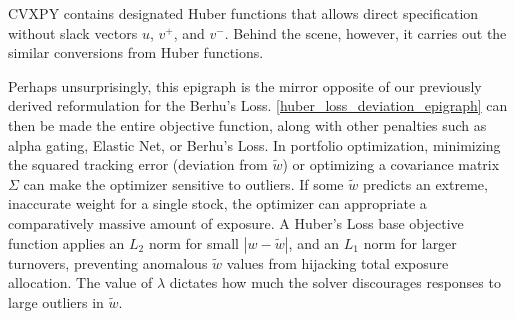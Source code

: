 \documentclass[11pt, letterpaper]{article}
\begin{document}
CVXPY \cite{cvxpy} contains designated Huber functions that allows direct specification without slack vectors $u$, $v^+$, and
$v^-$. Behind the scene, however, it carries out the similar conversions from Huber functions.

Perhaps unsurprisingly, this epigraph is the mirror opposite of our previously derived reformulation for the Berhu's Loss.
\eqref{huber_loss_deviation_epigraph} can then be made the entire objective function, along with other penalties such as alpha
gating, Elastic Net, or Berhu's Loss. In portfolio optimization, minimizing the squared tracking error (deviation from
$\tilde{w}$) or optimizing a covariance matrix $\Sigma$ can make the optimizer sensitive to outliers. If some $\tilde{w}$
predicts an extreme, inaccurate weight for a single stock, the optimizer can appropriate a comparatively massive amount of
exposure. A Huber's Loss base objective function applies an $L_2$ norm for small $|w - \tilde{w}|$, and an $L_1$ norm for larger
turnovers, preventing anomalous $\tilde{w}$ values from hijacking total exposure allocation. The value of $\lambda$ dictates how
much the solver discourages responses to large outliers in $\tilde{w}$.


\newpage

\nocite{*}





\end{document}
